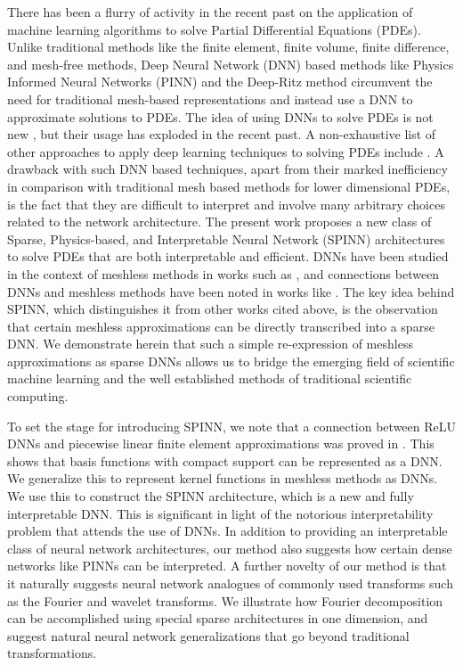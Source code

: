 \documentclass[12pt]{article}
\begin{document}
There has been a flurry of activity in the recent past on the application of machine learning algorithms to solve Partial Differential Equations (PDEs). Unlike traditional methods like the finite element, finite volume, finite difference, and mesh-free methods, Deep Neural Network (DNN) based methods like Physics Informed Neural Networks (PINN) \cite{RPK2019} and the Deep-Ritz method \cite{EYu2018} circumvent the need for traditional mesh-based representations and instead use a DNN to approximate solutions to PDEs. The idea of using DNNs to solve PDEs is not new \cite{LLF97}, but their usage has exploded in the recent past. A non-exhaustive list of other approaches to apply deep learning techniques to solving PDEs include \cite{SiKo2018, HJE2018, LLMXD2018, lu2021deepxde, SAGNGHZR2020, WZ2020, LCX2020, CCLL2020, WXZZ2020pre, LTPGC2021, DS2020}. A drawback with such DNN based techniques, apart from their marked inefficiency in comparison with traditional mesh based methods for lower dimensional PDEs, is the fact that they are difficult to interpret and involve many arbitrary choices related to the network architecture. The present work proposes a new class of Sparse, Physics-based, and Interpretable Neural Network (SPINN) architectures to solve PDEs that are both interpretable and efficient. DNNs have been studied in the context of meshless methods in works such as \cite{HHM2020, WZ2020}, and connections between DNNs and meshless methods have been noted in works like \cite{EMW20}. The key idea behind SPINN, which distinguishes it from other works cited above, is the observation that certain meshless approximations can be directly transcribed into a sparse DNN. We demonstrate herein that such a simple re-expression of meshless approximations as sparse DNNs allows us to bridge the emerging field of scientific machine learning and the well established methods of traditional scientific computing.

To set the stage for introducing SPINN, we note that a connection between ReLU DNNs and piecewise linear finite element approximations was proved in \cite{HLXZ2020}. This shows that basis functions with compact support can be represented as a DNN. We generalize this to represent kernel functions in meshless methods as DNNs. We use this to construct the SPINN architecture, which is a new and fully interpretable DNN. This is significant in light of the notorious interpretability problem that attends the use of DNNs. In addition to providing an interpretable class of neural network architectures, our method also suggests how certain dense networks like PINNs can be interpreted. A further novelty of our method is that it naturally suggests neural network analogues of commonly used transforms such as the Fourier and wavelet transforms. We illustrate how Fourier decomposition can be accomplished using special sparse architectures in one dimension, and suggest natural neural network generalizations that go beyond traditional transformations.
\end{document}
